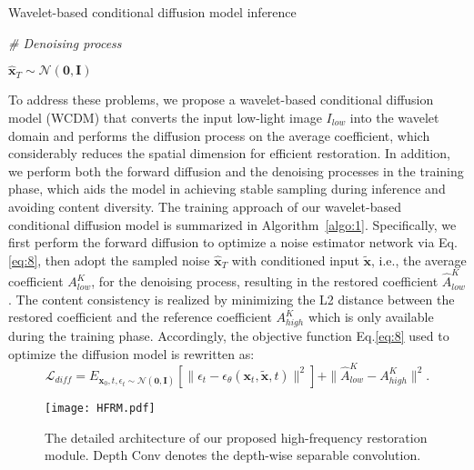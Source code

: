 \begin{algorithm}[!t]
	\caption{Wavelet-based conditional diffusion model inference}
	\label{algo:2} 
	  
	
	\emph{\# Denoising process}
	
	$\mathbf{\hat{x}}_T \sim \mathcal{N}(\mathbf{0},\mathbf{I})$
	
\end{algorithm}

To address these problems, we propose a wavelet-based conditional diffusion model (WCDM) that converts the input low-light image $I_{low}$ into the wavelet domain and performs the diffusion process on the average coefficient, which considerably reduces the spatial dimension for efficient restoration. In addition, we perform both the forward diffusion and the denoising processes in the training phase, which aids the model in achieving stable sampling during inference and avoiding content diversity. The training approach of our wavelet-based conditional diffusion model is summarized in Algorithm~\ref{algo:1}. Specifically, we first perform the forward diffusion to optimize a noise estimator network via Eq.\ref{eq:8}, then adopt the sampled noise $\mathbf{\hat{x}}_T$ with conditioned input $\tilde{\mathbf{x}}$, i.e., the average coefficient $A_{low}^{K}$, for the denoising process, resulting in the restored coefficient $\hat{A}_{low}^{K}$. The content consistency is realized by minimizing the L2 distance between the restored coefficient and the reference coefficient $A_{high}^{K}$ which is only available during the training phase. Accordingly, the objective function Eq.\ref{eq:8} used to optimize the diffusion model is rewritten as:
\begin{equation}\label{eq:9}
	\mathcal{L}_{diff} = E_{\mathbf{x}_0, t, \epsilon_t \sim \mathcal{N}(\mathbf{0},\mathbf{I})}[\|\epsilon_t-\epsilon_\theta(\mathbf{x}_t, \tilde{\mathbf{x}}, t)\|^2] + \|\hat{A}_{low}^{K} - A_{high}^{K}\|^2.
\end{equation}
\begin{figure}[!t]
	\centering
	\texttt{[image: HFRM.pdf]}
	\caption{The detailed architecture of our proposed high-frequency restoration module. Depth Conv denotes the depth-wise separable convolution.}
	\label{fig:HFRM_architecture}
\end{figure}

